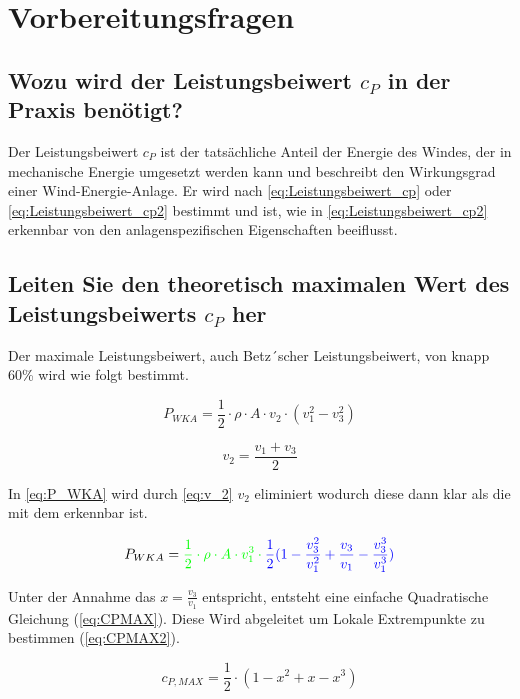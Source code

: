 \section{Vorbereitungsfragen}
\subsection{Wozu wird der Leistungsbeiwert $c_P$ in der Praxis benötigt?}
Der Leistungsbeiwert $c_P$ ist der tatsächliche Anteil der Energie des Windes, der in mechanische Energie umgesetzt werden kann und beschreibt den Wirkungsgrad einer Wind-Energie-Anlage. Er wird nach \ref{eq:Leistungsbeiwert_cp} oder \ref{eq:Leistungsbeiwert_cp2} bestimmt und ist, wie in \ref{eq:Leistungsbeiwert_cp2} erkennbar von den anlagenspezifischen Eigenschaften beeiflusst.



\subsection{Leiten Sie den theoretisch maximalen Wert des Leistungsbeiwerts $c_P$ her}
Der maximale Leistungsbeiwert, auch Betz´scher Leistungsbeiwert, von knapp 60\% wird wie folgt bestimmt.

\begin{equation}
P_{WKA}= \frac{1}{2} \cdot \rho \cdot A \cdot v_2 \cdot (v_1^2 - v_3^2)
\label{eq:P_WKA} 
\end{equation}

\begin{equation}
v_2= \frac{v_1+v_3}{2} 
\label{eq:v_2} 
\end{equation}

In \ref{eq:P_WKA} wird durch \ref{eq:v_2} $v_2$ eliminiert wodurch diese dann klar als die \color{green}{Leistung des Windes} mit dem \color{blue}{Leistungsbeiwert} erkennbar ist. 

\begin{equation}
P_{WKA}= \color{green}{\frac{1}{2} \cdot \rho \cdot A \cdot v_1^3 } \cdot \color{blue}{\frac{1}{2} (1-\frac{v_3^2}{v_1^2} + \frac{v_3}{v_1} - \frac{v_3^3}{v_1^3}})
\label{eq:P_WKA2} 
\end{equation}

\color{black}{}

Unter der Annahme das $x=\frac{v_3}{v_1}$ entspricht, entsteht eine einfache Quadratische Gleichung (\ref{eq:CPMAX}). Diese Wird abgeleitet um Lokale Extrempunkte zu bestimmen (\ref{eq:CPMAX2}). 

\begin{equation}
c_{P,MAX}= \frac{1}{2} \cdot (1-x^2+x-x^3)
\label{eq:CPMAX}
\end{equation}

